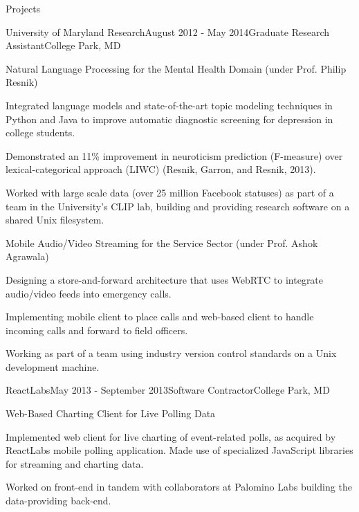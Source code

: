\documentclass{resume} %
\begin{document}
\begin{rSection}{Projects}

\begin{rSubsection}{University of Maryland Research}{August 2012 - May 2014}{Graduate Research Assistant}{College Park, MD}
\item
\begin{rWorkProject}{Natural Language Processing for the Mental Health Domain (under Prof. Philip Resnik)}
\item Integrated language models and state-of-the-art topic modeling techniques in Python and Java to improve automatic diagnostic screening for depression in college students.
\item Demonstrated an 11\% improvement in neuroticism prediction (F-measure) over lexical-categorical approach (LIWC) (Resnik, Garron, and Resnik, 2013).
\item Worked with large scale data (over 25 million Facebook statuses) as part of a team in the University's CLIP lab, building and providing research software on a shared Unix filesystem.
\end{rWorkProject}
\item
\begin{rWorkProject}{Mobile Audio/Video Streaming for the Service Sector (under Prof. Ashok Agrawala)}
\item Designing a store-and-forward architecture that uses WebRTC to integrate audio/video feeds into emergency calls.
\item Implementing mobile client to place calls and web-based client to handle incoming calls and forward to field officers.
\item Working as part of a team using industry version control standards on a Unix development machine.
\end{rWorkProject}
\end{rSubsection}

\begin{rSubsection}{ReactLabs}{May 2013 - September 2013}{Software Contractor}{College Park, MD}
\item
\begin{rWorkProject}{Web-Based Charting Client for Live Polling Data}
\item Implemented web client for live charting of event-related polls, as acquired by ReactLabs mobile polling application. Made use of specialized JavaScript libraries for streaming and charting data.
\item Worked on front-end in tandem with collaborators at Palomino Labs building the data-providing back-end.
\end{rWorkProject}
\end{rSubsection}



\end{rSection}
\end{document}
